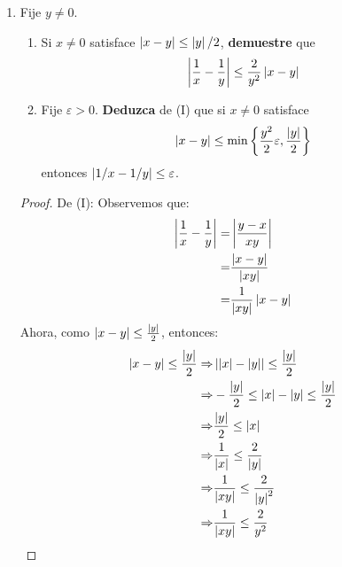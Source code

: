 \documentclass[12pt]{article}
\begin{document}
\begin{enumerate}
\begin{proof}
\begin{equation*}
\begin{split}
                    \Rightarrow\abs{\sqrt{x}-\sqrt{y}}\leq&\varepsilon
                \end{split}
            \end{equation*}
            \qed
    \end{proof}
    \item Fije $y\neq0$.
    \begin{enumerate}
        \item Si $x\neq0$ satisface $\left| x-y \right|\leq\left| y \right|/2$, \textbf{demuestre} que
        \begin{equation*}
            \left| \frac{1}{x}-\frac{1}{y} \right|\leq\frac{2}{y^2}\left| x-y \right|
        \end{equation*}
        \item Fije $\varepsilon>0$. \textbf{Deduzca} de (I) que si $x\neq0$ satisface
        \begin{equation*}
            \left| x-y \right|\leq\min\left\{\frac{y^2}{2}\varepsilon,\frac{\left| y \right|}{2}\right\}
        \end{equation*}
        entonces $\left| 1/x-1/y \right|\leq\varepsilon$.
    \end{enumerate}
    \begin{proof}
        De (I): Observemos que:
        \begin{equation*}
            \begin{split}
                \left| \frac{1}{x}-\frac{1}{y} \right|=&\left| \frac{y-x}{xy} \right|\\
                =&\frac{\left| x-y \right|}{\left| xy \right|}\\
                =&\frac{1}{\left| xy \right|}\left| x-y \right|
            \end{split}
        \end{equation*}
        Ahora, como $\left| x-y \right|\leq\frac{\left| y \right|}{2}$, entonces:
        \begin{equation*}
            \begin{split}
                \abs{x-y}\leq\frac{\abs{y}}{2}\Rightarrow&\abs{\abs{x}-\abs{y}}\leq\frac{\abs{y}}{2}\\
                \Rightarrow&-\frac{\abs{y}}{2}\leq\abs{x}-\abs{y}\leq\frac{\abs{y}}{2}\\
                \Rightarrow&\frac{\abs{y}}{2}\leq\abs{x}\\
                \Rightarrow&\frac{1}{\abs{x}}\leq\frac{2}{\abs{y}}\\
                \Rightarrow&\frac{1}{\abs{xy}}\leq\frac{2}{\abs{y}^2}\\
                \Rightarrow&\frac{1}{\abs{xy}}\leq\frac{2}{y^2}

\end{split}
\end{equation*}
\end{proof}
\end{enumerate}
\end{document}
